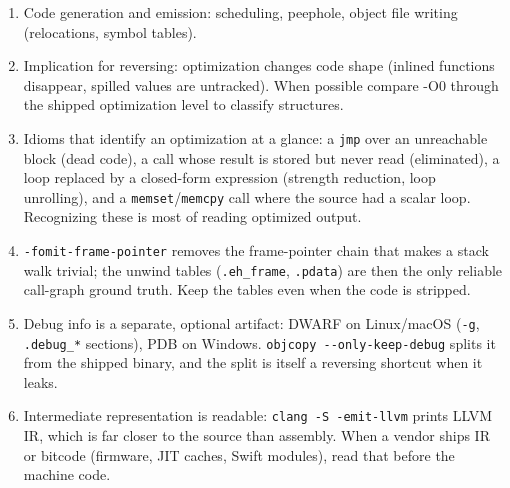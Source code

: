 \documentclass[12pt]{Training}
\begin{document}
\begin{enumerate}
\begin{enumerate}
        \item Code generation and emission: scheduling, peephole, object file writing (relocations, symbol tables).
        \item Implication for reversing: optimization changes code shape (inlined functions disappear, spilled values are untracked). When possible compare -O0 through the shipped optimization level to classify structures.
        \item Idioms that identify an optimization at a glance: a \lstinline{jmp} over an unreachable block (dead code), a call whose result is stored but never read (eliminated), a loop replaced by a closed-form expression (strength reduction, loop unrolling), and a \lstinline{memset}/\lstinline{memcpy} call where the source had a scalar loop. Recognizing these is most of reading optimized output.
        \item \lstinline{-fomit-frame-pointer} removes the frame-pointer chain that makes a stack walk trivial; the unwind tables (\lstinline{.eh_frame}, \lstinline{.pdata}) are then the only reliable call-graph ground truth. Keep the tables even when the code is stripped.
        \item Debug info is a separate, optional artifact: DWARF on Linux/macOS (\lstinline{-g}, \lstinline{.debug_*} sections), PDB on Windows. \lstinline{objcopy --only-keep-debug} splits it from the shipped binary, and the split is itself a reversing shortcut when it leaks.
        \item Intermediate representation is readable: \lstinline{clang -S -emit-llvm} prints LLVM IR, which is far closer to the source than assembly. When a vendor ships IR or bitcode (firmware, JIT caches, Swift modules), read that before the machine code.
\end{enumerate}
\end{enumerate}
\end{document}
